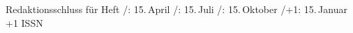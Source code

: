 \vfill

\parbox{\textwidth}{%
Redaktionsschluss für Heft
\ifcase\DTKissue                   {}/\DTKyear: 15.\,April \DTKyear  {}/\DTKyear: 15.\,Juli \DTKyear   {}/\DTKyear: 15.\,Oktober \DTKyear{}/\the\numexpr\DTKyear+1\relax: 15.\,Januar \the\numexpr\DTKyear+1\relax
\fi
\hfill \mbox{ISSN \DTKissn}}

\endgroup
\endinput


